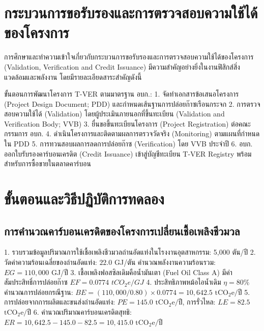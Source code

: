 \section{กระบวนการขอรับรองและการตรวจสอบความใช้ได้ของโครงการ}

การศึกษาและทำความเข้าใจเกี่ยวกับกระบวนการขอรับรองและการตรวจสอบความใช้ได้ของโครงการ (Validation, Verification and Credit Issuance) มีความสำคัญอย่างยิ่งในงานฟิสิกส์สิ่งแวดล้อมและพลังงาน โดยมีรายละเอียดสาระสำคัญดังนี้

ขั้นตอนการพัฒนาโครงการ T-VER ตามมาตรฐาน อบก.:
1. จัดทำเอกสารข้อเสนอโครงการ (Project Design Document; PDD) และกำหนดเส้นฐานการปล่อยก๊าซเรือนกระจก
2. การตรวจสอบความใช้ได้ (Validation) โดยผู้ประเมินภายนอกที่ขึ้นทะเบียน (Validation and Verification Body; VVB)
3. ยื่นขอขึ้นทะเบียนโครงการ (Project Registration) ต่อคณะกรรมการ อบก.
4. ดำเนินโครงการและติดตามผลการตรวจวัดจริง (Monitoring) ตามแผนที่กำหนดใน PDD
5. การทวนสอบผลการลดการปล่อยก๊าซ (Verification) โดย VVB ประจำปี
6. อบก. ออกใบรับรองคาร์บอนเครดิต (Credit Issuance) เข้าสู่บัญชีทะเบียน T-VER Registry พร้อมสำหรับการซื้อขายในตลาดคาร์บอน

\section{ขั้นตอนและวิธีปฏิบัติการทดลอง}

\subsection{การคำนวณคาร์บอนเครดิตของโครงการเปลี่ยนเชื้อเพลิงชีวมวล}
\begin{conceptbox}
1. รวบรวมข้อมูลปริมาณการใช้เชื้อเพลิงชีวมวลถ่านอัดแท่งในโรงงานอุตสาหกรรม: 5,000 ตัน/ปี
2. วัดค่าความร้อนเฉลี่ยของถ่านอัดแท่ง: $22.0$ GJ/ตัน คำนวณพลังงานความร้อนรวม: $EG = 110,000$ GJ/ปี
3. เชื้อเพลิงฟอสซิลเดิมคือน้ำมันเตา (Fuel Oil Class A) มีค่าสัมประสิทธิ์การปล่อยก๊าซ $EF = 0.0774$ $tCO_2e/GJ$
4. ประสิทธิภาพหม้อไอน้ำเดิม $\eta = 80\%$ คำนวณการปล่อยกรณีฐาน: $BE = (110,000 / 0.80) \times 0.0774 = 10,642.5\text{ tCO}_2\text{e/ปี}$
5. การปล่อยจากการผลิตและขนส่งถ่านอัดแท่ง: $PE = 145.0$ $\text{tCO}_2\text{e/ปี}$, การรั่วไหล: $LE = 82.5$ $\text{tCO}_2\text{e/ปี}$
6. คำนวณปริมาณคาร์บอนเครดิตสุทธิ: $ER = 10,642.5 - 145.0 - 82.5 = 10,415.0\text{ tCO}_2\text{e/ปี}$
\end{conceptbox}

